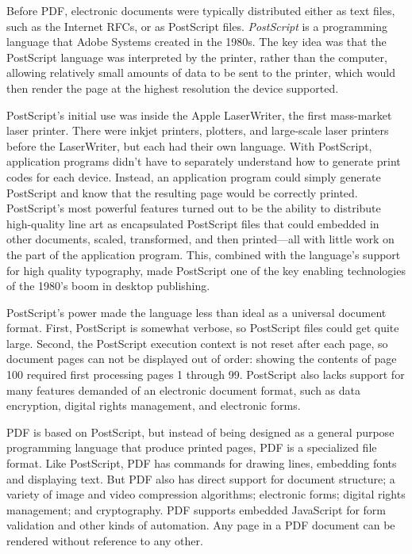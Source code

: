 \documentclass{article}
\begin{document}
Before PDF, electronic documents were typically distributed either as text
files, such as the Internet RFCs, or as PostScript
files. \emph{PostScript} is a programming language that Adobe Systems
created in the 1980s. The key idea 
was that the PostScript language was interpreted by the printer, rather than 
the computer, allowing relatively small amounts of data to be sent to
the printer, which would then render the page at the highest resolution
the device supported. 

PostScript's initial use was inside the Apple LaserWriter, the first
mass-market laser printer. There were inkjet printers, plotters, and
large-scale laser printers before the LaserWriter, but each 
had their own  language. With PostScript, application
programs didn't have to separately understand how to generate print
codes for each device. Instead, an
application program could simply generate PostScript and know that the
resulting page would be correctly printed. PostScript's most powerful features turned out to be
the ability to distribute high-quality line art as encapsulated
PostScript files that could embedded in other documents, scaled,
transformed, and then printed---all with little work on the part of
the application program. This, combined with the language's support
for high quality typography, made PostScript one of the key enabling
technologies of the 1980's boom in desktop publishing.

PostScript's power made the language
less than ideal as a universal document format. First, PostScript
 is somewhat verbose, so PostScript files could get quite
large. Second, the PostScript execution context is not reset
after each page, so document pages can not be displayed out of
order: showing the contents of page 100 required first processing pages 1 through 99. PostScript also
lacks support for many features demanded of an electronic document format,
such as data encryption, digital rights management, and electronic forms.

PDF is based on PostScript, but instead of being designed as a general
purpose programming language that produce printed pages, PDF is a
specialized file format. Like PostScript, PDF has
commands for drawing lines, embedding fonts and displaying text. But PDF also has direct support for
document structure; a variety of image and video compression
algorithms; electronic forms; digital rights management; and
cryptography. PDF supports embedded JavaScript for form validation
and other kinds of automation. Any page in a PDF document can be
rendered without reference to any other. 
\end{document}
